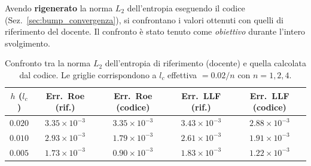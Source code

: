 Avendo \textbf{rigenerato} la norma $L_2$ dell'entropia eseguendo il codice
(Sez.~\ref{sec:bump_convergenza}), si confrontano i valori ottenuti con quelli di riferimento del
docente. Il confronto è stato tenuto come \emph{obiettivo} durante l'intero svolgimento.

\begin{table}[H]
  \centering
  \caption{Confronto tra la norma $L_2$ dell'entropia di riferimento (docente) e quella calcolata
           dal codice. Le griglie corrispondono a $l_c$ effettiva $=0.02/n$ con $n=1,2,4$.}
  \label{tab:bump_confronto}
  \renewcommand{\arraystretch}{1.2}
  \begin{tabular}{ccccc}
    \toprule
    $h$ ($l_c$) & Err.\ Roe (rif.) & Err.\ Roe (codice) & Err.\ LLF (rif.) & Err.\ LLF (codice) \\
    \midrule
    $0.020$ & $3.35\times10^{-3}$ & $3.35\times10^{-3}$ & $3.43\times10^{-3}$ & $2.88\times10^{-3}$ \\
    $0.010$ & $2.93\times10^{-3}$ & $1.79\times10^{-3}$ & $2.61\times10^{-3}$ & $1.91\times10^{-3}$ \\
    $0.005$ & $1.73\times10^{-3}$ & $0.90\times10^{-3}$ & $1.83\times10^{-3}$ & $1.22\times10^{-3}$ \\
    \bottomrule
  \end{tabular}
\end{table}


